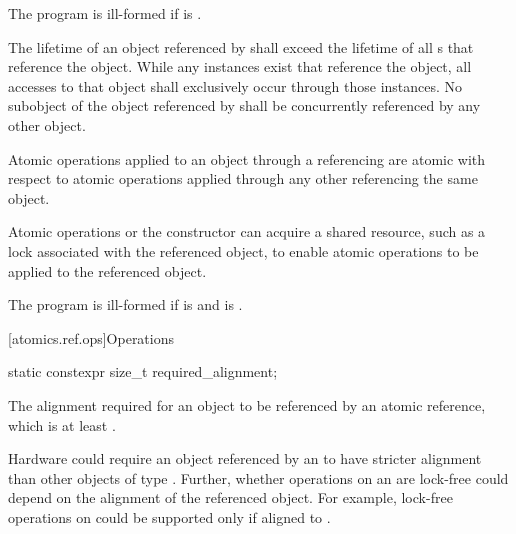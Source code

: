 \pnum
The program is ill-formed if  is .

\pnum
The lifetime of an object referenced by 
shall exceed the lifetime of all s that reference the object.
While any  instances exist
that reference the  object,
all accesses to that object shall exclusively occur
through those  instances.
No subobject of the object referenced by 
shall be concurrently referenced by any other  object.

\pnum
Atomic operations applied to an object
through a referencing  are atomic with respect to
atomic operations applied through any other 
referencing the same object.
\begin{note}
Atomic operations or the  constructor can acquire
a shared resource, such as a lock associated with the referenced object,
to enable atomic operations to be applied to the referenced object.
\end{note}

\pnum
The program is ill-formed
if  is  and
 is .

[atomics.ref.ops]{Operations}

%
%
%
%
\begin{itemdecl}
static constexpr size_t required_alignment;
\end{itemdecl}

\begin{itemdescr}
\pnum
The alignment required for an object to be referenced by an atomic reference,
which is at least .

\pnum
\begin{note}
Hardware could require an object
referenced by an 
to have stricter alignment
than other objects of type .
Further, whether operations on an 
are lock-free could depend on the alignment of the referenced object.
For example, lock-free operations on 
could be supported only if aligned to .
\end{note}
\end{itemdescr}

